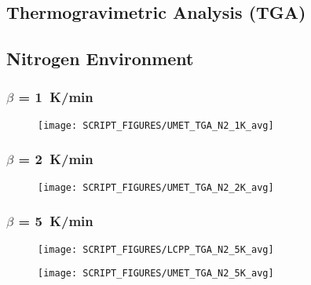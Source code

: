 \begin{landscape}
\section{Thermogravimetric Analysis (TGA)}
\subsection{Nitrogen Environment}
\label{TGA_N2}
\subsubsection{$\beta$ = 1~K/min}
\begin{minipage}{0.65\textwidth}
\begin{figure}[H]
{\texttt{[image: SCRIPT\_FIGURES/UMET\_TGA\_N2\_1K\_avg]}}\\
\end{figure}
\end{minipage}
\vfill
\newpage
\subsubsection{$\beta$ = 2~K/min}
\begin{minipage}{0.65\textwidth}
\begin{figure}[H]
{\texttt{[image: SCRIPT\_FIGURES/UMET\_TGA\_N2\_2K\_avg]}}\\
\end{figure}
\end{minipage} 

\newpage
\subsubsection{$\beta$ = 5~K/min}
\begin{minipage}{0.65\textwidth}
\begin{figure}[H]
{\texttt{[image: SCRIPT\_FIGURES/LCPP\_TGA\_N2\_5K\_avg]}}\\
\end{figure}
\end{minipage} 
\begin{minipage}{0.35\textwidth}
\begin{figure}[H]
{\texttt{[image: SCRIPT\_FIGURES/UMET\_TGA\_N2\_5K\_avg]}}\\
\end{figure}
\end{minipage}

\newpage

\end{landscape}
